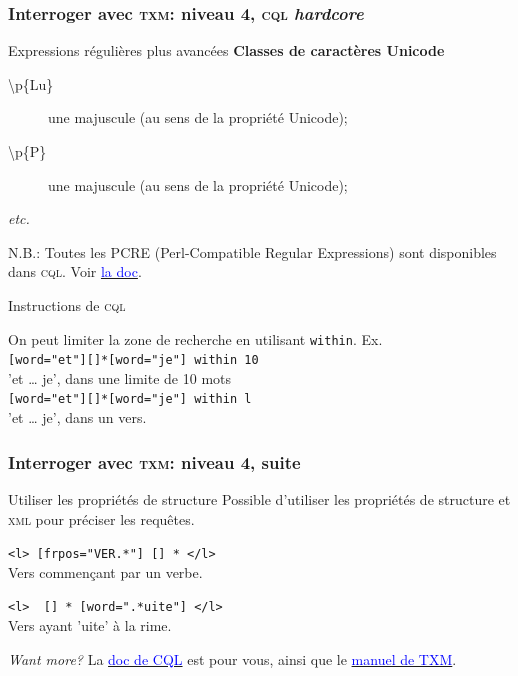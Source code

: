 \documentclass{beamer}
\begin{document}
\begin{frame}[fragile]
\frametitle{Interroger avec \textsc{txm}: niveau 4, \textsc{cql} \emph{hardcore}}
		
		\begin{block}{Expressions régulières plus avancées}
			\textbf{Classes de caractères Unicode}
			\begin{description}
				\item[\textbackslash{}p\{Lu\}] une majuscule (au sens de la propriété Unicode);
				\item[\textbackslash{}p\{P\}] une majuscule (au sens de la propriété Unicode);
				\item[\textit{etc.}]
			\end{description}
		\end{block}
		
		N.B.: \alert{Toutes les PCRE (Perl-Compatible Regular Expressions) sont disponibles dans \textsc{cql}}. 
		Voir  \href{http://regexkit.sourceforge.net/Documentation/pcre/pcrepattern.html}{\textcolor{blue}{la doc}}.
		
		
		\begin{block}{Instructions de \textsc{cql}}
			
			On peut limiter la zone de recherche en utilisant \texttt{within}.
			Ex. \\
			\verb|[word="et"][]*[word="je"] within 10|\\
			'et … je', dans une limite de 10 mots\\
			\verb|[word="et"][]*[word="je"] within l|\\
			'et … je', dans un vers.
		\end{block}

\end{frame}

\begin{frame}[fragile]
\frametitle{Interroger avec \textsc{txm}: niveau 4, suite}

\begin{block}{Utiliser les propriétés de structure}
	Possible d'utiliser les propriétés de structure et \textsc{xml} pour préciser les requêtes.
	
	\verb|<l> [frpos="VER.*"] [] * </l>|\\
	Vers commençant par un verbe.
	
	\verb|<l>  [] * [word=".*uite"] </l>|\\
	Vers ayant 'uite' à la rime.
	
\end{block}

\textit{Want more?} La \href{http://cwb.sourceforge.net/documentation.php}{\textcolor{blue}{doc de CQL}} est pour vous, ainsi que le 
\href{http://txm.sourceforge.net/doc/manual/manual1.xhtml}{\textcolor{blue}{manuel de TXM}}.

\end{frame}
\end{document}
